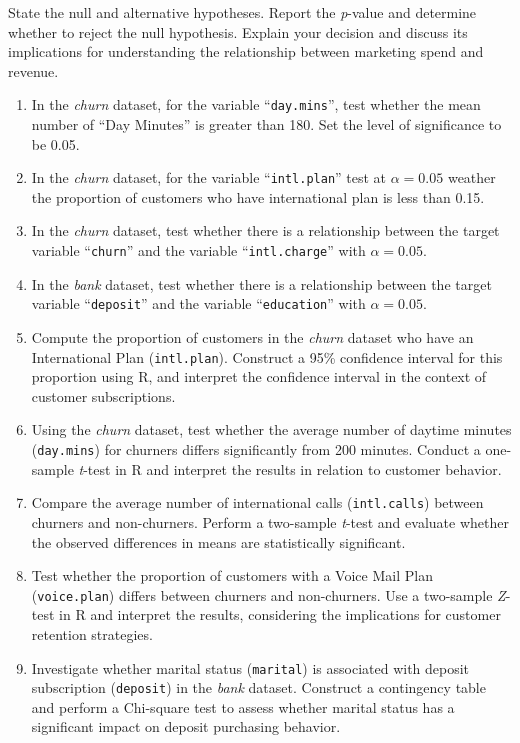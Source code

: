 \documentclass[
  11pt,
]{book}
\theoremstyle{definition}
\theoremstyle{definition}
\theoremstyle{definition}
\theoremstyle{definition}
\theoremstyle{remark}
\begin{document}
State the null and alternative hypotheses. Report the \emph{p}-value and determine whether to reject the null hypothesis. Explain your decision and discuss its implications for understanding the relationship between marketing spend and revenue.

\begin{enumerate}
\def\labelenumi{\arabic{enumi}.}
\setcounter{enumi}{15}
\item
  In the \emph{churn} dataset, for the variable ``\texttt{day.mins}'', test whether the mean number of ``Day Minutes'' is greater than 180. Set the level of significance to be 0.05.
\item
  In the \emph{churn} dataset, for the variable ``\texttt{intl.plan}'' test at \(\alpha=0.05\) weather the proportion of customers who have international plan is less than 0.15.
\item
  In the \emph{churn} dataset, test whether there is a relationship between the target variable ``\texttt{churn}'' and the variable ``\texttt{intl.charge}'' with \(\alpha=0.05\).
\item
  In the \emph{bank} dataset, test whether there is a relationship between the target variable ``\texttt{deposit}'' and the variable ``\texttt{education}'' with \(\alpha=0.05\).
\item
  Compute the proportion of customers in the \emph{churn} dataset who have an International Plan (\texttt{intl.plan}). Construct a 95\% confidence interval for this proportion using R, and interpret the confidence interval in the context of customer subscriptions.
\item
  Using the \emph{churn} dataset, test whether the average number of daytime minutes (\texttt{day.mins}) for churners differs significantly from 200 minutes. Conduct a one-sample \emph{t}-test in R and interpret the results in relation to customer behavior.
\item
  Compare the average number of international calls (\texttt{intl.calls}) between churners and non-churners. Perform a two-sample \emph{t}-test and evaluate whether the observed differences in means are statistically significant.
\item
  Test whether the proportion of customers with a Voice Mail Plan (\texttt{voice.plan}) differs between churners and non-churners. Use a two-sample \emph{Z}-test in R and interpret the results, considering the implications for customer retention strategies.
\item
  Investigate whether marital status (\texttt{marital}) is associated with deposit subscription (\texttt{deposit}) in the \emph{bank} dataset. Construct a contingency table and perform a Chi-square test to assess whether marital status has a significant impact on deposit purchasing behavior.

\end{enumerate}
\end{document}
